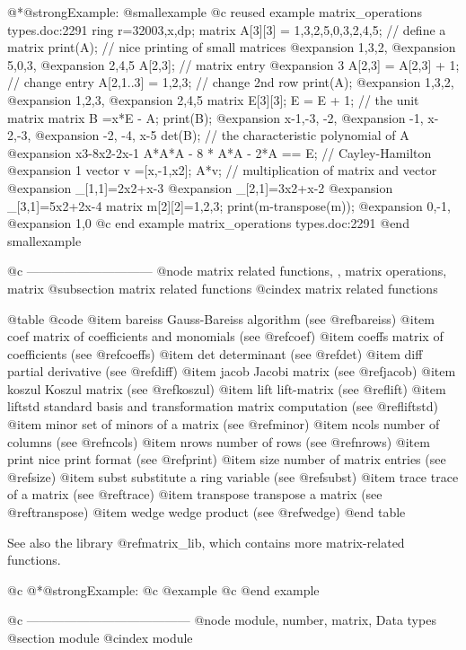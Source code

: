 {{{{{{@*@strong{Example:}
@smallexample
@c reused example matrix_operations types.doc:2291 
  ring r=32003,x,dp;
  matrix A[3][3] = 1,3,2,5,0,3,2,4,5; // define a matrix
  print(A); // nice printing of small matrices
@expansion{} 1,3,2,
@expansion{} 5,0,3,
@expansion{} 2,4,5 
  A[2,3];   // matrix entry
@expansion{} 3
  A[2,3] = A[2,3] + 1; // change entry
  A[2,1..3] = 1,2,3;   // change 2nd row
  print(A);
@expansion{} 1,3,2,
@expansion{} 1,2,3,
@expansion{} 2,4,5 
  matrix E[3][3]; E = E + 1;  // the unit matrix
  matrix B =x*E - A;
  print(B);
@expansion{} x-1,-3, -2,
@expansion{} -1, x-2,-3,
@expansion{} -2, -4, x-5
  det(B);        // the characteristic polynomial of A
@expansion{} x3-8x2-2x-1
  A*A*A - 8 * A*A - 2*A == E;  // Cayley-Hamilton
@expansion{} 1
  vector v =[x,-1,x2];
  A*v; // multiplication of matrix and vector
@expansion{} _[1,1]=2x2+x-3
@expansion{} _[2,1]=3x2+x-2
@expansion{} _[3,1]=5x2+2x-4
  matrix m[2][2]=1,2,3;
  print(m-transpose(m));
@expansion{} 0,-1,
@expansion{} 1,0  
@c end example matrix_operations types.doc:2291
@end smallexample

@c ------------------------------
@node matrix related functions,  , matrix operations, matrix
@subsection matrix related functions
@cindex matrix related functions

@table @code
@item bareiss
Gauss-Bareiss algorithm (see @ref{bareiss})
@item coef
matrix of coefficients and monomials (see @ref{coef})
@item coeffs
matrix of coefficients (see @ref{coeffs})
@item det
determinant (see @ref{det})
@item diff
partial derivative (see @ref{diff})
@item jacob
Jacobi matrix (see @ref{jacob})
@item koszul
Koszul matrix (see @ref{koszul})
@item lift
lift-matrix (see @ref{lift})
@item liftstd
standard basis and transformation matrix computation (see @ref{liftstd})
@item minor
set of minors of a matrix (see @ref{minor})
@item ncols
number of columns (see @ref{ncols})
@item nrows
number of rows (see @ref{nrows})
@item print
nice print format (see @ref{print})
@item size
number of matrix entries (see @ref{size})
@item subst
substitute a ring variable (see @ref{subst})
@item trace
trace of a matrix (see @ref{trace})
@item transpose
transpose a matrix (see @ref{transpose})
@item wedge
wedge product (see @ref{wedge})
@end table

See also the library @ref{matrix_lib}, which contains more
matrix-related functions.

@c @*@strong{Example:}
@c @example
@c @end example

@c ---------------------------------------
@node module, number, matrix, Data types
@section module
@cindex module

}}}}}}
